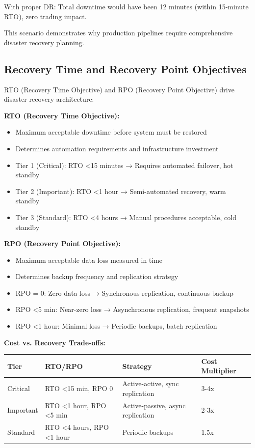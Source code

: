With proper DR: Total downtime would have been 12 minutes (within 15-minute RTO), zero trading impact.

This scenario demonstrates why production pipelines require comprehensive disaster recovery planning.

\subsection{Recovery Time and Recovery Point Objectives}

RTO (Recovery Time Objective) and RPO (Recovery Point Objective) drive disaster recovery architecture:

\textbf{RTO (Recovery Time Objective):}
\begin{itemize}
    \item Maximum acceptable downtime before system must be restored
    \item Determines automation requirements and infrastructure investment
    \item Tier 1 (Critical): RTO <15 minutes → Requires automated failover, hot standby
    \item Tier 2 (Important): RTO <1 hour → Semi-automated recovery, warm standby
    \item Tier 3 (Standard): RTO <4 hours → Manual procedures acceptable, cold standby
\end{itemize}

\textbf{RPO (Recovery Point Objective):}
\begin{itemize}
    \item Maximum acceptable data loss measured in time
    \item Determines backup frequency and replication strategy
    \item RPO = 0: Zero data loss → Synchronous replication, continuous backup
    \item RPO <5 min: Near-zero loss → Asynchronous replication, frequent snapshots
    \item RPO <1 hour: Minimal loss → Periodic backups, batch replication
\end{itemize}

\textbf{Cost vs. Recovery Trade-offs:}

\begin{center}
\begin{tabular}{|l|l|l|l|}
\hline
\textbf{Tier} & \textbf{RTO/RPO} & \textbf{Strategy} & \textbf{Cost Multiplier} \\
\hline
Critical & RTO <15 min, RPO 0 & Active-active, sync replication & 3-4x \\
Important & RTO <1 hour, RPO <5 min & Active-passive, async replication & 2-3x \\
Standard & RTO <4 hours, RPO <1 hour & Periodic backups & 1.5x \\
\hline
\end{tabular}
\end{center}

